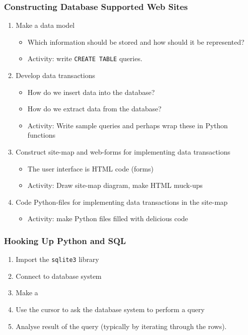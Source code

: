 \documentclass[dvipsnames]{beamer}
\begin{document}
\begin{frame}
\frametitle{Constructing Database Supported Web Sites} 

\begin{enumerate}[Step 1:]
  \item Make a data model
    \begin{itemize}
    \item Which information should be stored and how should it be
      represented?
    \item Activity: write \texttt{CREATE TABLE} queries.
    \end{itemize}


  \item Develop data transactions
    \begin{itemize}
    \item How do we insert data into the database?
    \item How do we extract data from the database?
    \item Activity: Write sample \sql{} queries and perhaps wrap these
      in Python functions
    \end{itemize}


  \item Construct site-map and web-forms for implementing data transactions
    \begin{itemize}
    \item The user interface is HTML code (forms)
    \item Activity: Draw site-map diagram, make HTML muck-ups 
    \end{itemize}


  \item Code Python-files for implementing data transactions in the
    site-map
    \begin{itemize}
    \item Activity: make Python files filled with delicious code 
    \end{itemize}

\end{enumerate}
\end{frame}

\begin{frame}
  \frametitle{Hooking Up Python and SQL}
  \begin{enumerate}
  \item Import the \texttt{sqlite3} library 
  \item Connect to database system
  \item Make a 
  \item Use the cursor to ask the database system to perform a query
  \item Analyse result of the query (typically by iterating through
    the rows).
  \end{enumerate}
\end{frame}
\end{document}
